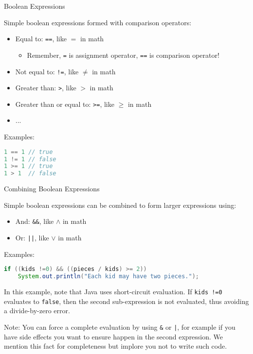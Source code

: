 \documentclass{beamer}
\begin{document}
\begin{frame}[fragile]{Boolean Expressions}


Simple boolean expressions formed with comparison operators:
\begin{itemize}
\item Equal to: {\tt ==}, like $=$ in math
  \begin{itemize}
    \item Remember, {\tt =} is assignment operator, {\tt ==} is comparison operator!
  \end{itemize}
\item Not equal to: {\tt !=}, like $\ne$ in math
\item Greater than: {\tt >}, like $>$ in math
\item Greater than or equal to: {\tt >=}, like $\ge$ in math
\item ...
\end{itemize}
Examples:
\begin{lstlisting}[language=Java]
1 == 1 // true
1 != 1 // false
1 >= 1 // true
1 > 1  // false
\end{lstlisting}

\end{frame}

\begin{frame}[fragile]{Combining Boolean Expressions}


Simple boolean expressions can be combined to form larger expressions using:
\begin{itemize}
\item And: {\tt \&\&}, like $\land$ in math
\item Or: {\tt ||}, like $\lor$ in math
\end{itemize}
Examples:
\vspace{-.05in}
\begin{lstlisting}[language=Java]
if ((kids !=0) && ((pieces / kids) >= 2))
    System.out.println("Each kid may have two pieces.");
\end{lstlisting}
\vspace{-.05in}
In this example, note that Java uses short-circuit evaluation.  If
{\tt kids !=0} evaluates to {\tt false}, then the second sub-expression is not evaluated, thus avoiding a divide-by-zero error.

\vspace{.1in}
Note: You can force a complete evaluation by using {\tt \&} or {\tt |}, for example if you have side effects you want to ensure happen in the second expression.  We mention this fact for completeness but implore you not to write such code.

\end{frame}
\end{document}
